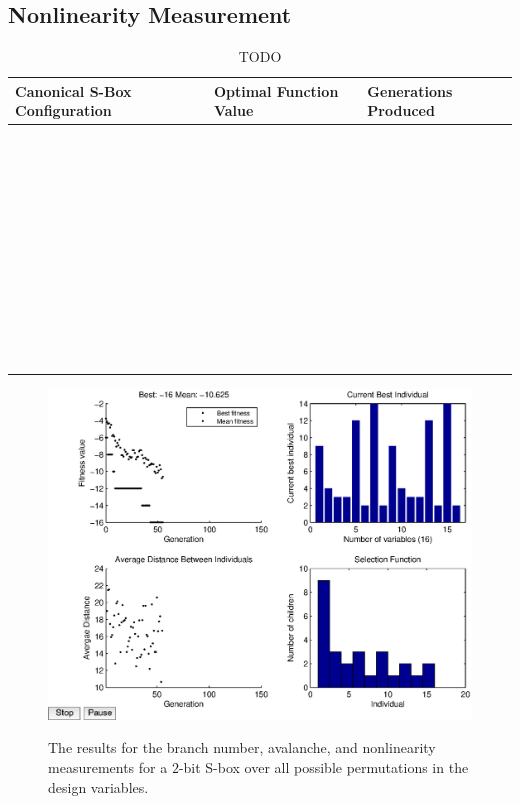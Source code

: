 \documentclass[11pt]{article}
\begin{document}
\subsection{Nonlinearity Measurement}

\begin{table}
	\centering
	\caption{TODO}
	\label{nlTable}
    \begin{tabular}{|l|l|l|}
        \hline
        Canonical S-Box Configuration & Optimal Function Value & Generations Produced \\ \hline
        ~ & ~ & ~ \\ 
        ~ & ~ & ~ \\ 
        ~ & ~ & ~ \\ 
        ~ & ~ & ~ \\ 
        ~ & ~ & ~ \\ 
        ~ & ~ & ~ \\ 
        ~ & ~ & ~ \\ 
        ~ & ~ & ~ \\ 
        ~ & ~ & ~ \\ 
        ~ & ~ & ~ \\
        \hline
    \end{tabular}
\end{table}

\begin{figure}
	\centering
	\includegraphics[scale=0.5]{images/nl_results16.eps} \\
	\label{nl16}
\caption{The results for the branch number, avalanche, and nonlinearity measurements for a $2$-bit S-box over all possible permutations in the design variables.}
\end{figure}
\end{document}
